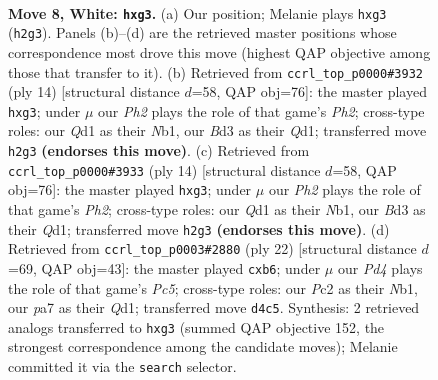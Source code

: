\documentclass[11pt]{article}
\begin{document}
\begin{figure}[p]\centering
\begin{subfigure}{0.46\textwidth}\centering
\resizebox{\linewidth}{!}{%
\newchessgame
\chessboard[
  setfen={rnbq1rk1/pp3ppp/4pn2/2pp4/3P4/3BPNb1/PPP2PPP/RN1Q1RK1 w - - 0 8},
  showmover=false,
  pgfstyle=straightmove, color=movearrow, markmove={h2-g3}
]}
\caption{}
\end{subfigure}\hfill
\begin{subfigure}{0.46\textwidth}\centering
\resizebox{\linewidth}{!}{%
\newchessgame
\chessboard[
  setfen={rn1qk2r/pbp2ppp/1p2pn2/3p4/3P4/4PNb1/PPP1BPPP/RN1Q1RK1 w kq - 0 8},
  showmover=false,
  pgfstyle=straightmove, color=movearrow, markmove={h2-g3}
]}
\caption{}
\end{subfigure}
\\[4pt]
\begin{subfigure}{0.46\textwidth}\centering
\resizebox{\linewidth}{!}{%
\newchessgame
\chessboard[
  setfen={rn1qk2r/pbp2ppp/1p2pn2/3p4/3P4/4PNb1/PPP1BPPP/RN1Q1RK1 w kq - 0 8},
  showmover=false,
  pgfstyle=straightmove, color=movearrow, markmove={h2-g3}
]}
\caption{}
\end{subfigure}\hfill
\begin{subfigure}{0.46\textwidth}\centering
\resizebox{\linewidth}{!}{%
\newchessgame
\chessboard[
  setfen={rn3rk1/p1q1bppp/bp2pn2/2P5/2p5/1P1N2P1/P2BPPBP/RN1Q1RK1 w - - 0 12},
  showmover=false,
  pgfstyle=straightmove, color=movearrow, markmove={c5-b6}
]}
\caption{}
\end{subfigure}
\caption{\textbf{Move 8, White: \texttt{hxg3}.} (a) Our position; Melanie plays \texttt{hxg3} (\texttt{h2g3}). Panels (b)--(d) are the retrieved master positions whose correspondence most drove this move (highest QAP objective among those that transfer to it). (b) Retrieved from \texttt{ccrl\_top\_p0000\#3932} (ply 14) [structural distance $d$=58, QAP obj=76]: the master played \texttt{hxg3}; under $\mu$ our \emph{Ph2} plays the role of that game's \emph{Ph2}; cross-type roles: our \emph{Q}d1 as their \emph{N}b1, our \emph{B}d3 as their \emph{Q}d1; transferred move \texttt{h2g3} \textbf{(endorses this move)}. (c) Retrieved from \texttt{ccrl\_top\_p0000\#3933} (ply 14) [structural distance $d$=58, QAP obj=76]: the master played \texttt{hxg3}; under $\mu$ our \emph{Ph2} plays the role of that game's \emph{Ph2}; cross-type roles: our \emph{Q}d1 as their \emph{N}b1, our \emph{B}d3 as their \emph{Q}d1; transferred move \texttt{h2g3} \textbf{(endorses this move)}. (d) Retrieved from \texttt{ccrl\_top\_p0003\#2880} (ply 22) [structural distance $d$=69, QAP obj=43]: the master played \texttt{cxb6}; under $\mu$ our \emph{Pd4} plays the role of that game's \emph{Pc5}; cross-type roles: our \emph{P}c2 as their \emph{N}b1, our \emph{p}a7 as their \emph{Q}d1; transferred move \texttt{d4c5}. Synthesis: 2 retrieved analogs transferred to \texttt{hxg3} (summed QAP objective 152, the strongest correspondence among the candidate moves); Melanie committed it via the \texttt{search} selector.}
\label{fig:thought-m14}
\end{figure}
\end{document}
